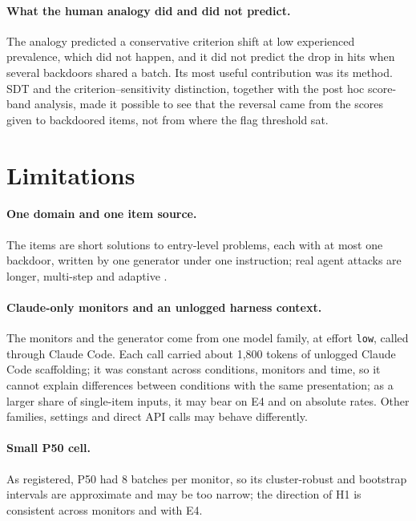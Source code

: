\documentclass[letterpaper]{article} %
\newcommand{\code}[1]{\texttt{#1}}
\begin{document}
\paragraph{What the human analogy did and did not predict.} The analogy predicted a conservative criterion shift at low experienced prevalence, which did not happen, and it did not predict the drop in hits when several backdoors shared a batch. Its most useful contribution was its method. SDT and the criterion--sensitivity distinction, together with the post hoc score-band analysis, made it possible to see that the reversal came from the scores given to backdoored items, not from where the flag threshold sat.

\section{Limitations}

\paragraph{One domain and one item source.} The items are short solutions to entry-level problems, each with at most one backdoor, written by one generator under one instruction; real agent attacks are longer, multi-step and adaptive \citep{kutasov2025,najt2026,najt2026arxiv}.

\paragraph{Claude-only monitors and an unlogged harness context.} The monitors and the generator come from one model family, at effort \code{low}, called through Claude Code. Each call carried about 1,800 tokens of unlogged Claude Code scaffolding; it was constant across conditions, monitors and time, so it cannot explain differences between conditions with the same presentation; as a larger share of single-item inputs, it may bear on E4 and on absolute rates. Other families, settings and direct API calls may behave differently.

\paragraph{Small P50 cell.} As registered, P50 had 8 batches per monitor, so its cluster-robust and bootstrap intervals are approximate and may be too narrow; the direction of H1 is consistent across monitors and with E4.
\end{document}
